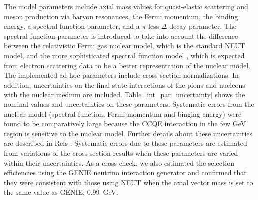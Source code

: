 \documentclass[%
 reprint,
superscriptaddress,
 amsmath,amssymb,
 aps,
]{revtex4-1}
\begin{document}
The model parameters include axial mass values for quasi-elastic scattering and meson production via baryon resonances, the Fermi momentum, the binding energy, a spectral function parameter, and a $\pi$-less $\Delta$ decay parameter.
The spectral function parameter is introduced to take into account the difference between the relativistic Fermi gas nuclear model, which is the standard NEUT model, and the more sophisticated spectral function model \cite{sf_imp}, which is expected from electron scattering data \cite{escat1, escat2} to be a better representation of the nuclear model.
The implemented ad hoc parameters include cross-section normalizations.
In addition, uncertainties on the final state interactions of the pions and nucleons with the nuclear medium are included.
Table~\ref{int_par_uncertainty} shows the nominal values and uncertainties on these parameters.
Systematic errors from the nuclear model (spectral function, Fermi momentum and binging energy) were found to be comparatively large because the CCQE interaction in the few GeV region is sensitive to the nuclear model.
Further details about these uncertainties are described in Refs \cite{t2k_ccinc,t2k_nue_2013}.
Systematic errors due to these parameters are estimated from variations of the cross-section results when these parameters are varied within their uncertainties.
As a cross check, we also estimated the selection efficiencies using the GENIE neutrino interaction generator and confirmed that they were consistent with those using NEUT when the axial vector mass is set to the same value as GENIE, 0.99~GeV.
\end{document}
